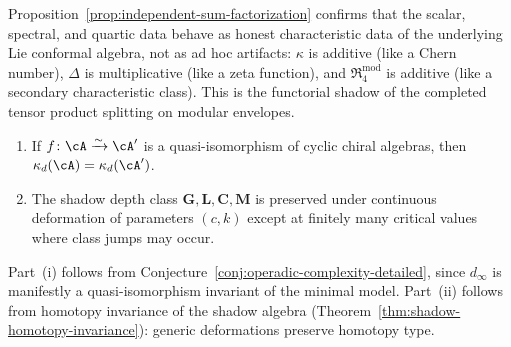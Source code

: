 \begin{remark}
\label{rem:shadow-characteristic-data}
Proposition~\ref{prop:independent-sum-factorization}
confirms that the scalar, spectral, and quartic data
behave as honest characteristic data of the underlying
Lie conformal algebra, not as ad hoc artifacts:
$\kappa$ is additive (like a Chern number),
$\Delta$ is multiplicative (like a zeta function), and
$\mathfrak{R}_4^{\mathrm{mod}}$ is additive
(like a secondary characteristic class).
This is the functorial shadow of the completed tensor
product splitting on modular envelopes.
\end{remark}

\begin{conjecture}
\label{conj:shadow-depth-invariant}
\ClaimStatusConjectured
{}
\begin{enumerate}[label=\textup{(\roman*)}]
\item If $f\colon \cA \xrightarrow{\sim} \cA'$ is a
  quasi-isomorphism of cyclic chiral algebras, then
  $\kappa_d(\cA) = \kappa_d(\cA')$.
\item The shadow depth class
  $\mathbf{G}, \mathbf{L}, \mathbf{C}, \mathbf{M}$
  is preserved under continuous deformation of
  parameters $(c, k)$ except at finitely many critical
  values where class jumps may occur.
\end{enumerate}
Part~(i) follows from
Conjecture~\textup{\ref{conj:operadic-complexity-detailed}},
since $d_\infty$ is manifestly a quasi-isomorphism
invariant of the minimal model.
Part~(ii) follows from homotopy invariance of the shadow
algebra
(Theorem~\ref{thm:shadow-homotopy-invariance}): generic
deformations preserve homotopy type.
\end{conjecture}

